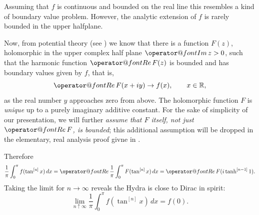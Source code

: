 \documentclass{amsart}
\makeatletter
\theoremstyle{plain}
\numberwithin{equation}{section}
\newcommand{\R}{{\mathbb  R}}
\renewcommand{\Re}{{\operator@font Re\,}}
\renewcommand{\Im}{{\operator@font Im\,}}
\makeatother
\begin{document}
Assuming that $f$ is continuous and bounded on the real line this resembles a kind of boundary value problem. However, the analytic extension of $f$ is rarely bounded in the upper halfplane.

Now, from potential theory (see \cite[Thms. 15.1a, 15.4d]{Hen}) we know that there is a function $F(z)$, holomorphic
in the upper complex half plane $\Im z >0$, such that the harmonic function $\Re F(z)$ is bounded and has boundary values given by $f$, that is,
\begin{equation}\label{eq.F}
\Re F(x+ i y) \to f(x), \qquad x\in\R,
\end{equation}
as the real number $y$ approaches zero from above. The holomorphic function $F$ is \emph{unique}
up to a purely imaginary additive constant. For the sake of simplicity of our presentation, we will further
{\em assume that $F$ itself, not just $\Re F$, is bounded}\/; this additional assumption will be dropped
in the elementary, real analysis proof givne in \cite{BornemannSchmelzer}.

Therefore
\[
\frac{1}{\pi}\int_0^\pi f(\tan^{[n]}x)\,dx = \Re \frac{1}{\pi} \int_0^\pi F(\tan^{[n]}x)\,dx = \Re F(i \tanh^{[n-1]}1).
\]
Taking the limit for $n \to \infty$ reveals the Hydra is close to Dirac in spirit:
\[
\lim_{n \uparrow \infty} \frac{1}{\pi}\int_0^\pi f(\tan^{[n]}x)\,dx = f(0).
\]




\end{document}
